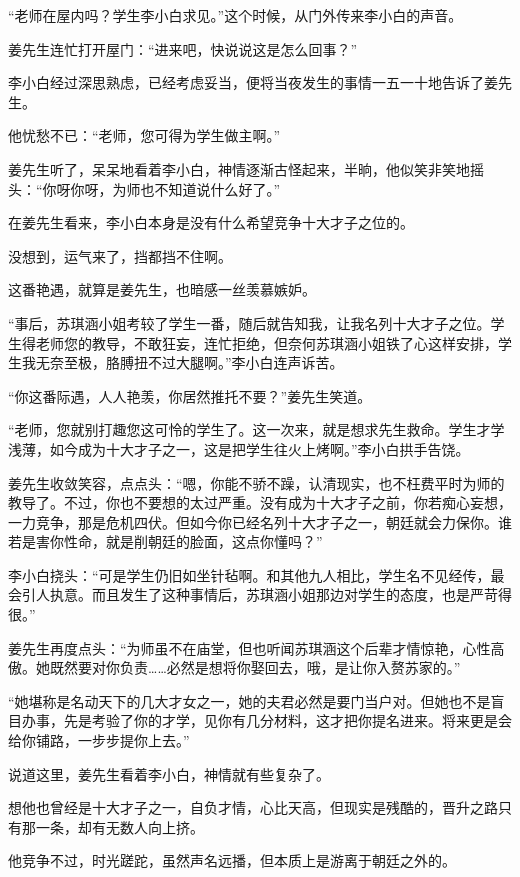 \begin{this_body}
“老师在屋内吗？学生李小白求见。”这个时候，从门外传来李小白的声音。

姜先生连忙打开屋门：“进来吧，快说说这是怎么回事？”

李小白经过深思熟虑，已经考虑妥当，便将当夜发生的事情一五一十地告诉了姜先生。

他忧愁不已：“老师，您可得为学生做主啊。”

姜先生听了，呆呆地看着李小白，神情逐渐古怪起来，半晌，他似笑非笑地摇头：“你呀你呀，为师也不知道说什么好了。”

在姜先生看来，李小白本身是没有什么希望竞争十大才子之位的。

没想到，运气来了，挡都挡不住啊。

这番艳遇，就算是姜先生，也暗感一丝羡慕嫉妒。

“事后，苏琪涵小姐考较了学生一番，随后就告知我，让我名列十大才子之位。学生得老师您的教导，不敢狂妄，连忙拒绝，但奈何苏琪涵小姐铁了心这样安排，学生我无奈至极，胳膊扭不过大腿啊。”李小白连声诉苦。

“你这番际遇，人人艳羡，你居然推托不要？”姜先生笑道。

“老师，您就别打趣您这可怜的学生了。这一次来，就是想求先生救命。学生才学浅薄，如今成为十大才子之一，这是把学生往火上烤啊。”李小白拱手告饶。

姜先生收敛笑容，点点头：“嗯，你能不骄不躁，认清现实，也不枉费平时为师的教导了。不过，你也不要想的太过严重。没有成为十大才子之前，你若痴心妄想，一力竞争，那是危机四伏。但如今你已经名列十大才子之一，朝廷就会力保你。谁若是害你性命，就是削朝廷的脸面，这点你懂吗？”

李小白挠头：“可是学生仍旧如坐针毡啊。和其他九人相比，学生名不见经传，最会引人执意。而且发生了这种事情后，苏琪涵小姐那边对学生的态度，也是严苛得很。”

姜先生再度点头：“为师虽不在庙堂，但也听闻苏琪涵这个后辈才情惊艳，心性高傲。她既然要对你负责……必然是想将你娶回去，哦，是让你入赘苏家的。”

“她堪称是名动天下的几大才女之一，她的夫君必然是要门当户对。但她也不是盲目办事，先是考验了你的才学，见你有几分材料，这才把你提名进来。将来更是会给你铺路，一步步提你上去。”

说道这里，姜先生看着李小白，神情就有些复杂了。

想他也曾经是十大才子之一，自负才情，心比天高，但现实是残酷的，晋升之路只有那一条，却有无数人向上挤。

他竞争不过，时光蹉跎，虽然声名远播，但本质上是游离于朝廷之外的。


\end{this_body}

